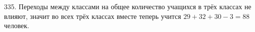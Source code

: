 335. Переходы между классами на общее количество учащихся в трёх классах не влияют, значит во всех трёх классах вместе теперь учится $29+32+30-3=88$ человек.\\
